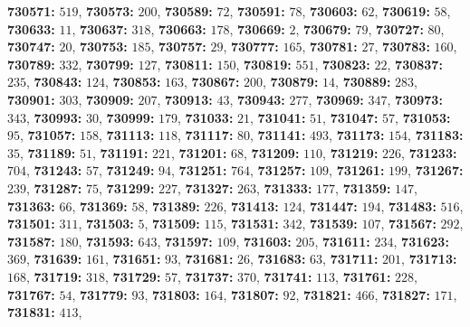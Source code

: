 \textsf{\bfseries 730571:} $519$, \textsf{\bfseries 730573:} $200$, \textsf{\bfseries 730589:} $72$, \textsf{\bfseries 730591:} $78$, \textsf{\bfseries 730603:} $62$, \textsf{\bfseries 730619:} $58$, \textsf{\bfseries 730633:} $11$, \textsf{\bfseries 730637:} $318$, \textsf{\bfseries 730663:} $178$, \textsf{\bfseries 730669:} $2$, \textsf{\bfseries 730679:} $79$, \textsf{\bfseries 730727:} $80$, \textsf{\bfseries 730747:} $20$, \textsf{\bfseries 730753:} $185$, \textsf{\bfseries 730757:} $29$, \textsf{\bfseries 730777:} $165$, \textsf{\bfseries 730781:} $27$, \textsf{\bfseries 730783:} $160$, \textsf{\bfseries 730789:} $332$, \textsf{\bfseries 730799:} $127$, \textsf{\bfseries 730811:} $150$, \textsf{\bfseries 730819:} $551$, \textsf{\bfseries 730823:} $22$, \textsf{\bfseries 730837:} $235$, \textsf{\bfseries 730843:} $124$, \textsf{\bfseries 730853:} $163$, \textsf{\bfseries 730867:} $200$, \textsf{\bfseries 730879:} $14$, \textsf{\bfseries 730889:} $283$, \textsf{\bfseries 730901:} $303$, \textsf{\bfseries 730909:} $207$, \textsf{\bfseries 730913:} $43$, \textsf{\bfseries 730943:} $277$, \textsf{\bfseries 730969:} $347$, \textsf{\bfseries 730973:} $343$, \textsf{\bfseries 730993:} $30$, \textsf{\bfseries 730999:} $179$, \textsf{\bfseries 731033:} $21$, \textsf{\bfseries 731041:} $51$, \textsf{\bfseries 731047:} $57$, \textsf{\bfseries 731053:} $95$, \textsf{\bfseries 731057:} $158$, \textsf{\bfseries 731113:} $118$, \textsf{\bfseries 731117:} $80$, \textsf{\bfseries 731141:} $493$, \textsf{\bfseries 731173:} $154$, \textsf{\bfseries 731183:} $35$, \textsf{\bfseries 731189:} $51$, \textsf{\bfseries 731191:} $221$, \textsf{\bfseries 731201:} $68$, \textsf{\bfseries 731209:} $110$, \textsf{\bfseries 731219:} $226$, \textsf{\bfseries 731233:} $704$, \textsf{\bfseries 731243:} $57$, \textsf{\bfseries 731249:} $94$, \textsf{\bfseries 731251:} $764$, \textsf{\bfseries 731257:} $109$, \textsf{\bfseries 731261:} $199$, \textsf{\bfseries 731267:} $239$, \textsf{\bfseries 731287:} $75$, \textsf{\bfseries 731299:} $227$, \textsf{\bfseries 731327:} $263$, \textsf{\bfseries 731333:} $177$, \textsf{\bfseries 731359:} $147$, \textsf{\bfseries 731363:} $66$, \textsf{\bfseries 731369:} $58$, \textsf{\bfseries 731389:} $226$, \textsf{\bfseries 731413:} $124$, \textsf{\bfseries 731447:} $194$, \textsf{\bfseries 731483:} $516$, \textsf{\bfseries 731501:} $311$, \textsf{\bfseries 731503:} $5$, \textsf{\bfseries 731509:} $115$, \textsf{\bfseries 731531:} $342$, \textsf{\bfseries 731539:} $107$, \textsf{\bfseries 731567:} $292$, \textsf{\bfseries 731587:} $180$, \textsf{\bfseries 731593:} $643$, \textsf{\bfseries 731597:} $109$, \textsf{\bfseries 731603:} $205$, \textsf{\bfseries 731611:} $234$, \textsf{\bfseries 731623:} $369$, \textsf{\bfseries 731639:} $161$, \textsf{\bfseries 731651:} $93$, \textsf{\bfseries 731681:} $26$, \textsf{\bfseries 731683:} $63$, \textsf{\bfseries 731711:} $201$, \textsf{\bfseries 731713:} $168$, \textsf{\bfseries 731719:} $318$, \textsf{\bfseries 731729:} $57$, \textsf{\bfseries 731737:} $370$, \textsf{\bfseries 731741:} $113$, \textsf{\bfseries 731761:} $228$, \textsf{\bfseries 731767:} $54$, \textsf{\bfseries 731779:} $93$, \textsf{\bfseries 731803:} $164$, \textsf{\bfseries 731807:} $92$, \textsf{\bfseries 731821:} $466$, \textsf{\bfseries 731827:} $171$, \textsf{\bfseries 731831:} $413$, 
